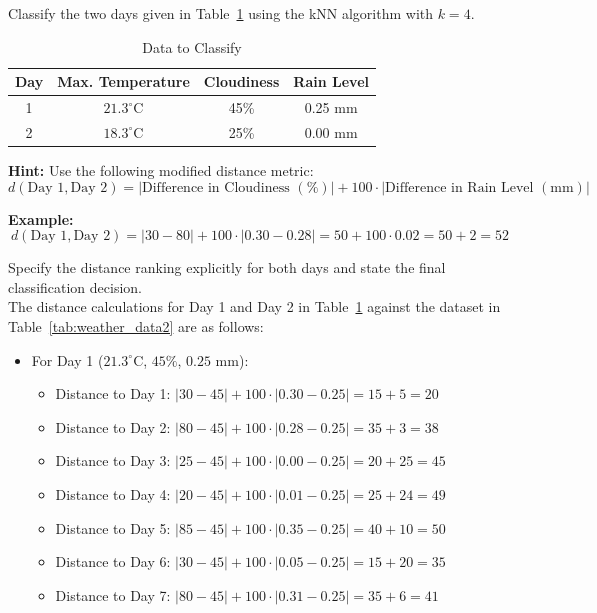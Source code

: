 \documentclass[12pt]{article}
\begin{document}
    \begin{ejercicio}
        Classify the two days given in Table~\ref{tab:data_to_classify2} using the kNN algorithm with $k=4$.

        \begin{table}[h!]
        \centering
        \begin{tabular}{|c|c|c|c|}
        \hline
        \textbf{Day} & \textbf{Max. Temperature} & \textbf{Cloudiness} & \textbf{Rain Level} \\ \hline
        1 & $21.3^{\circ}\text{C}$ & 45\% & 0.25 mm \\ \hline
        2 & $18.3^{\circ}\text{C}$ & 25\% & 0.00 mm \\ \hline
        \end{tabular}
        \caption{Data to Classify}
        \label{tab:data_to_classify2}
        \end{table}

        \textbf{Hint:} Use the following modified distance metric:
        \[ d(\text{Day } 1, \text{Day } 2) = |\text{Difference in Cloudiness } (\%)| + 100 \cdot |\text{Difference in Rain Level } (\text{mm})| \]

        \textbf{Example:}
        \[ d(\text{Day } 1, \text{Day } 2) = |30 - 80| + 100 \cdot |0.30 - 0.28| = 50 + 100 \cdot 0.02 = 50 + 2 = 52 \]

        Specify the distance ranking explicitly for both days and state the final classification decision.\\
        
        The distance calculations for Day 1 and Day 2 in Table~\ref{tab:data_to_classify2} against the dataset in Table~\ref{tab:weather_data2} are as follows:
        \begin{itemize}
            \item For Day 1 ($21.3^{\circ}\text{C}$, $45\%$, $0.25$ mm):
            \begin{itemize}
                \item Distance to Day 1: $|30 - 45| + 100 \cdot |0.30 - 0.25| = 15 + 5 = 20$
                \item Distance to Day 2: $|80 - 45| + 100 \cdot |0.28 - 0.25| = 35 + 3 = 38$
                \item Distance to Day 3: $|25 - 45| + 100 \cdot |0.00 - 0.25| = 20 + 25 = 45$
                \item Distance to Day 4: $|20 - 45| + 100 \cdot |0.01 - 0.25| = 25 + 24 = 49$
                \item Distance to Day 5: $|85 - 45| + 100 \cdot |0.35 - 0.25| = 40 + 10 = 50$
                \item Distance to Day 6: $|30 - 45| + 100 \cdot |0.05 - 0.25| = 15 + 20 = 35$
                \item Distance to Day 7: $|80 - 45| + 100 \cdot |0.31 - 0.25| = 35 + 6 = 41$
            \end{itemize}


\end{itemize}
\end{ejercicio}
\end{document}
